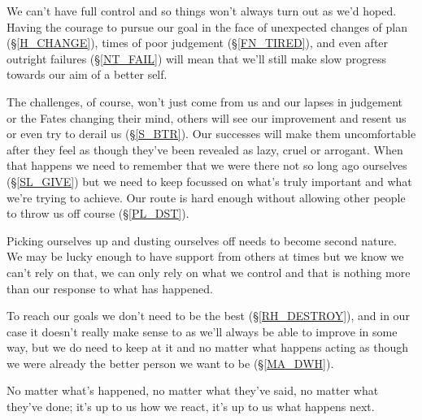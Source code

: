 \cleardoublepage
{\small

We can't have full control and so things won't always turn out as we'd hoped. Having the courage to pursue our goal in the face of unexpected changes of plan (\S \ref{H_CHANGE}), times of poor judgement (\S \ref{FN_TIRED}), and even after outright failures (\S \ref{NT_FAIL}) will mean that we'll still make slow progress towards our aim of a better self. 

The challenges, of course, won't just come from us and our lapses in judgement or the Fates changing their mind, others will see our improvement and resent us or even try to derail us (\S \ref{S_BTR}). Our successes will make them uncomfortable after they feel as though they've been revealed as lazy, cruel or arrogant. When that happens we need to remember that we were there not so long ago ourselves (\S \ref{SL_GIVE}) but we need to keep focussed on what's truly important and what we're trying to achieve. Our route is hard enough without allowing other people to throw us off course (\S \ref{PL_DST}).

Picking ourselves up and dusting ourselves off needs to become second nature. We may be lucky enough to have support from others at times but we know we can't rely on that, we can only rely on what we control and that is nothing more than our response to what has happened.

To reach our goals we don't need to be the best (\S \ref{RH_DESTROY}), and in our case it doesn't really make sense to  as we'll always be able to improve in some way, but we do need to keep at it and no matter what happens acting as though we were already the better person we want to be (\S \ref{MA_DWH}).

No matter what's happened, no matter what they've said, no matter what they've done; it's up to us how we react, it's up to us what happens next.

}
